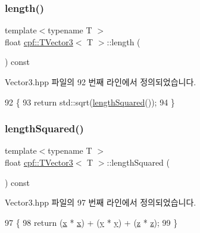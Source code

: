 \subsubsection{\texorpdfstring{length()}{length()}}
{\footnotesize\ttfamily template$<$typename T $>$ \\
float \hyperlink{classcpf_1_1_t_vector3}{cpf\+::\+T\+Vector3}$<$ T $>$\+::length (\begin{DoxyParamCaption}{ }\end{DoxyParamCaption}) const\hspace{0.3cm}{\ttfamily [inline]}}



Vector3.\+hpp 파일의 92 번째 라인에서 정의되었습니다.


\begin{DoxyCode}
92                              \{
93             \textcolor{keywordflow}{return} std::sqrt(\hyperlink{classcpf_1_1_t_vector3_ad8e765a30a7fcf269dc129bc458a8e58}{lengthSquared}());
94         \}
\end{DoxyCode}
\mbox{\label{classcpf_1_1_t_vector3_ad8e765a30a7fcf269dc129bc458a8e58}} 
\subsubsection{\texorpdfstring{length\+Squared()}{lengthSquared()}}
{\footnotesize\ttfamily template$<$typename T $>$ \\
float \hyperlink{classcpf_1_1_t_vector3}{cpf\+::\+T\+Vector3}$<$ T $>$\+::length\+Squared (\begin{DoxyParamCaption}{ }\end{DoxyParamCaption}) const\hspace{0.3cm}{\ttfamily [inline]}}



Vector3.\+hpp 파일의 97 번째 라인에서 정의되었습니다.


\begin{DoxyCode}
97                                     \{
98             \textcolor{keywordflow}{return} (\hyperlink{classcpf_1_1_t_vector3_ad3df42808358a64c518d6349ede446d8}{x} * \hyperlink{classcpf_1_1_t_vector3_ad3df42808358a64c518d6349ede446d8}{x}) + (\hyperlink{classcpf_1_1_t_vector3_a2371a0583e76dcc80c6f10dd168cde1b}{y} * \hyperlink{classcpf_1_1_t_vector3_a2371a0583e76dcc80c6f10dd168cde1b}{y}) + (\hyperlink{classcpf_1_1_t_vector3_ae7ea5f4b24c3438a44eb6b0fdfe02823}{z} * \hyperlink{classcpf_1_1_t_vector3_ae7ea5f4b24c3438a44eb6b0fdfe02823}{z});
99         \}
\end{DoxyCode}
\mbox{\label{classcpf_1_1_t_vector3_a06d8ed169a3e08e0c20498d97b9af248}} 
